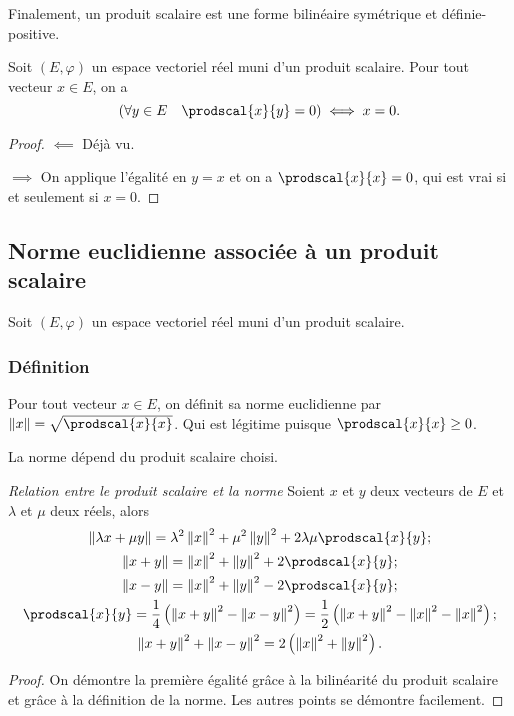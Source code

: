 Finalement, un produit scalaire est une forme bilinéaire symétrique et définie-positive.

\begin{prop}
  Soit  $(E,\varphi)$ un espace vectoriel réel muni d'un produit scalaire. Pour tout vecteur $x \in E$, on a
  \begin{equation}
    \left(\forall y \in E \quad \prodscal{x}{y}=0\right) \iff x=0.
  \end{equation}
\end{prop}
\begin{proof}
  $\impliedby$ Déjà vu.

  $\implies$ On applique l'égalité en $y=x$ et on a $\prodscal{x}{x}=0$, qui est vrai si et seulement si $x=0$. 
\end{proof}

\subsection{Norme euclidienne associée à un produit scalaire}

Soit  $(E,\varphi)$ un espace vectoriel réel muni d'un produit scalaire.

\subsubsection{Définition}

\begin{defdef}
  Pour tout vecteur $x \in E$, on définit sa norme euclidienne par $\norme{x}=\sqrt{\prodscal{x}{x}}$. Qui est légitime puisque $\prodscal{x}{x} \geq 0$.
\end{defdef}

\danger La norme dépend du produit scalaire choisi.

\emph{Relation entre le produit scalaire et la norme}
Soient $x$ et $y$ deux vecteurs de $E$ et $\lambda$ et $\mu$ deux réels, alors
\begin{gather}
  \norme{\lambda x + \mu y} = \lambda^2 \norme{x}^2 + \mu^2 \norme{y}^2 + 2\lambda\mu\prodscal{x}{y}; \\
  \norme{x + y} = \norme{x}^2 + \norme{y}^2 + 2\prodscal{x}{y}; \\
\norme{x - y} = \norme{x}^2 + \norme{y}^2 - 2\prodscal{x}{y}; \\
\prodscal{x}{y} = \frac{1}{4}\left(\norme{x+y}^2-\norme{x-y}^2 \right) = \frac{1}{2}\left(\norme{x+y}^2-\norme{x}^2-\norme{x}^2 \right);\\
\norme{x + y}^2+\norme{x - y}^2 = 2\left(\norme{x}^2 + \norme{y}^2\right).
\end{gather}
\begin{proof}
  On démontre la première égalité grâce à la bilinéarité du produit scalaire et grâce à la définition de la norme. Les autres points se démontre facilement.
\end{proof}

